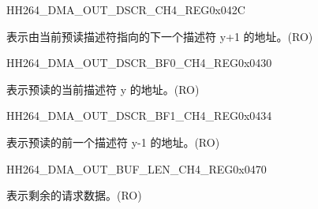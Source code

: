     
    \begin{register}{H}{H264\_DMA\_OUT\_DSCR\_CH4\_REG}{0x042C}\label{regdesc:H264DMAOUTDSCRCH4REG}
    \regnewline%
    \begin{regdesc}\begin{reglist}
    \label{fielddesc:H264DMAOUTLINKDSCRCH4}\item [H264\_DMA\_OUTLINK\_DSCR\_CH4] 表示由当前预读描述符指向的下一个描述符 y+1 的地址。(RO)
    \end{reglist}\end{regdesc}
    \end{register}
    
    
    \begin{register}{H}{H264\_DMA\_OUT\_DSCR\_BF0\_CH4\_REG}{0x0430}\label{regdesc:H264DMAOUTDSCRBF0CH4REG}
    \regnewline%
    \begin{regdesc}\begin{reglist}
    \label{fielddesc:H264DMAOUTLINKDSCRBF0CH4}\item [H264\_DMA\_OUTLINK\_DSCR\_BF0\_CH4] 表示预读的当前描述符 y 的地址。(RO)
    \end{reglist}\end{regdesc}
    \end{register}
    
    
    \begin{register}{H}{H264\_DMA\_OUT\_DSCR\_BF1\_CH4\_REG}{0x0434}\label{regdesc:H264DMAOUTDSCRBF1CH4REG}
    \regnewline%
    \begin{regdesc}\begin{reglist}
    \label{fielddesc:H264DMAOUTLINKDSCRBF1CH4}\item [H264\_DMA\_OUTLINK\_DSCR\_BF1\_CH4] 表示预读的前一个描述符 y-1 的地址。(RO)
    \end{reglist}\end{regdesc}
    \end{register}
    
    \begin{register}{H}{H264\_DMA\_OUT\_BUF\_LEN\_CH4\_REG}{0x0470}\label{regdesc:H264DMAOUTBUFLENCH4REG}
    \regnewline%
    \begin{regdesc}\begin{reglist}
    \label{fielddesc:H264DMAOUTCMDFIFOBUFLENHBCH4}\item [H264\_DMA\_OUT\_CMDFIFO\_BUF\_LEN\_HB\_CH4] 表示剩余的请求数据。(RO)
    \end{reglist}\end{regdesc}
    \end{register}
    
